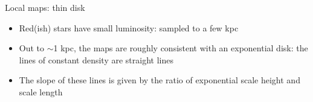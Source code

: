\documentclass[letterpaper,landscape]{slides}
\begin{document}
\begin{slide}
{\begin{minipage}[t]{9cm}
\begin{center}
\end{center}
\end{minipage}

\begin{minipage}[t]{13cm}
\begin{center}
\vskip -1in
{\large \color{red} Local maps: thin disk}
\end{center}

\begin{itemize}
\item Red(ish) stars have small luminosity: sampled to a few kpc
\item {\color{blue} Out to $\sim$1 kpc, the maps are roughly consistent 
with an exponential disk:} the lines of constant density are straight lines
\item The slope of these lines is given by the ratio of exponential
scale height and scale length 
\end{itemize}     
\vskip 0.1in

\end{minipage}}
\vfill 
\end{slide}
\end{document}
